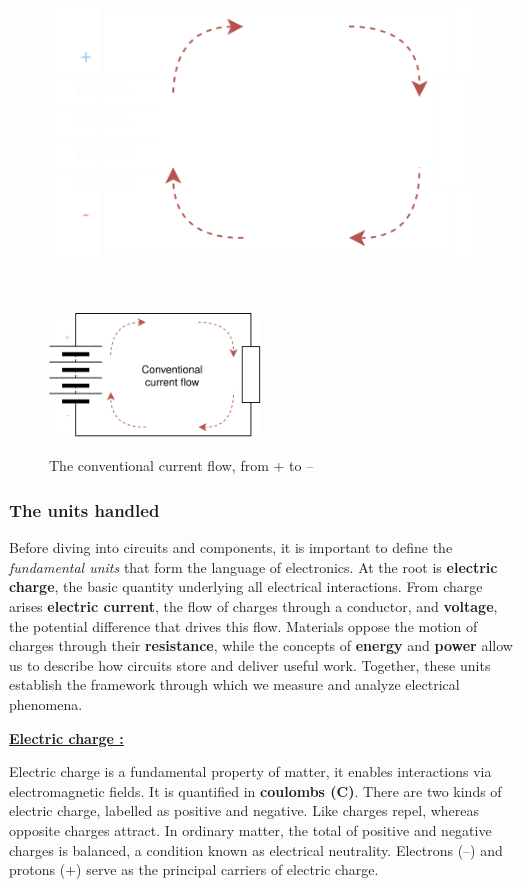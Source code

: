 \documentclass[11pt]{article}
\begin{document}
\begin{figure}[!h]
  \centering
  \ifdefined\HCode
  \includegraphics[height=25em,width=42em]
  {src/assets/current-flow-dark.png}
  \else
  \includegraphics[width=0.5\textwidth,keepaspectratio]
  {src/assets/current-flow-light.png}
  \fi
  \caption{The conventional current flow, from \(+\) to --}
\end{figure}

\subsubsection{The units handled}

Before diving into circuits and components, it is important to define
the \textit{fundamental units} that form the language of electronics.
At the root is \textbf{electric charge}, the basic quantity underlying
all electrical interactions. From charge arises \textbf{electric
current}, the flow of charges through a conductor, and \textbf{voltage},
the potential difference that drives this flow. Materials oppose the
motion of charges through their \textbf{resistance}, while the concepts
of \textbf{energy} and \textbf{power} allow us to describe how circuits
store and deliver useful work. Together, these units establish the
framework through which we measure and analyze electrical phenomena.\par
\vspace{\baselineskip}
\textbf{\underline{Electric charge :}}\par
\noindent
Electric charge is a fundamental property of matter, it enables
interactions via electromagnetic fields. It is quantified in \textbf{coulombs
(\unit{\coulomb})}. There are two kinds of electric charge, labelled as
positive and negative. Like charges repel, whereas opposite charges
attract. In ordinary matter, the total of positive and negative
charges is balanced, a condition known as electrical neutrality.
Electrons (--) and protons (\(+\)) serve as the principal carriers of
electric charge.
\end{document}
